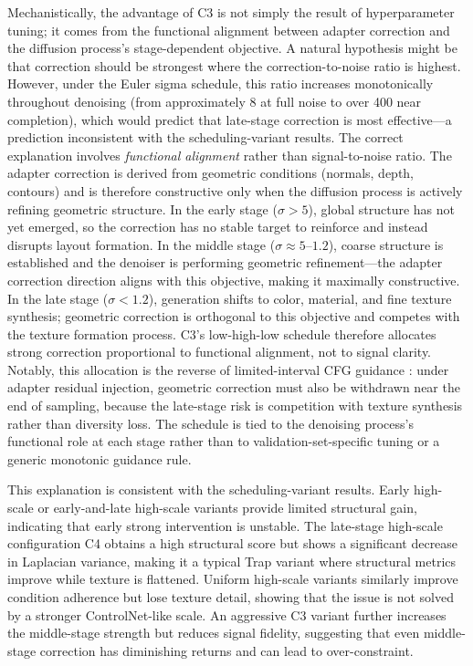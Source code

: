 \documentclass[times,twocolumn,final]{elsarticle}
\providecommand{\DIFadd}[1]{{\protect\color{blue} \sf #1}} %
\providecommand{\DIFaddbegin}{} %
\providecommand{\DIFaddend}{} %
\newcommand{\DIFaddincludegraphics}[2][]{{\color{blue}\fbox{\DIFOincludegraphics[#1]{#2}}}} %
\DeclareRobustCommand{\DIFaddbegin}{\DIFOaddbegin \let\includegraphics\DIFaddincludegraphics} %
\DeclareRobustCommand{\DIFaddend}{\DIFOaddend \let\includegraphics\DIFOincludegraphics} %
\begin{document}
Mechanistically, the advantage of C3 is not simply the result of hyperparameter tuning; it comes from the functional alignment between adapter correction and the diffusion process's stage-dependent objective. A natural hypothesis might be that correction should be strongest where the correction-to-noise ratio is highest. However, under the Euler sigma schedule, this ratio increases monotonically throughout denoising (from approximately 8 at full noise to over 400 near completion), which would predict that late-stage correction is most effective---a prediction inconsistent with the scheduling-variant results. The correct explanation involves \emph{functional alignment} rather than signal-to-noise ratio. The adapter correction is derived from geometric conditions (normals, depth, contours) and is therefore constructive only when the diffusion process is actively refining geometric structure. In the early stage ($\sigma > 5$), global structure has not yet emerged, so the correction has no stable target to reinforce and instead disrupts layout formation. In the middle stage ($\sigma \approx 5$--$1.2$), coarse structure is established and the denoiser is performing geometric refinement---the adapter correction direction aligns with this objective, making it maximally constructive. In the late stage ($\sigma < 1.2$), generation shifts to color, material, and fine texture synthesis; geometric correction is orthogonal to this objective and competes with the texture formation process. C3's low-high-low schedule therefore allocates strong correction proportional to functional alignment, not to signal clarity. \DIFaddbegin \DIFadd{Notably, this allocation is the reverse of limited-interval CFG guidance \cite{kynkanniemi2024limited}: under adapter residual injection, geometric correction must also be withdrawn near the end of sampling, because the late-stage risk is competition with texture synthesis rather than diversity loss. }\DIFaddend The schedule is tied to the denoising process's functional role at each stage rather than to validation-set-specific tuning or a generic monotonic guidance rule.

This explanation is consistent with the scheduling-variant results. Early high-scale or early-and-late high-scale variants provide limited structural gain, indicating that early strong intervention is unstable. The late-stage high-scale configuration C4 obtains a high structural score but shows a significant decrease in Laplacian variance, making it a typical Trap variant where structural metrics improve while texture is flattened. Uniform high-scale variants similarly improve condition adherence but lose texture detail, showing that the issue is not solved by a stronger ControlNet-like scale. An aggressive C3 variant further increases the middle-stage strength but reduces signal fidelity, suggesting that even middle-stage correction has diminishing returns and can lead to over-constraint.
\end{document}
